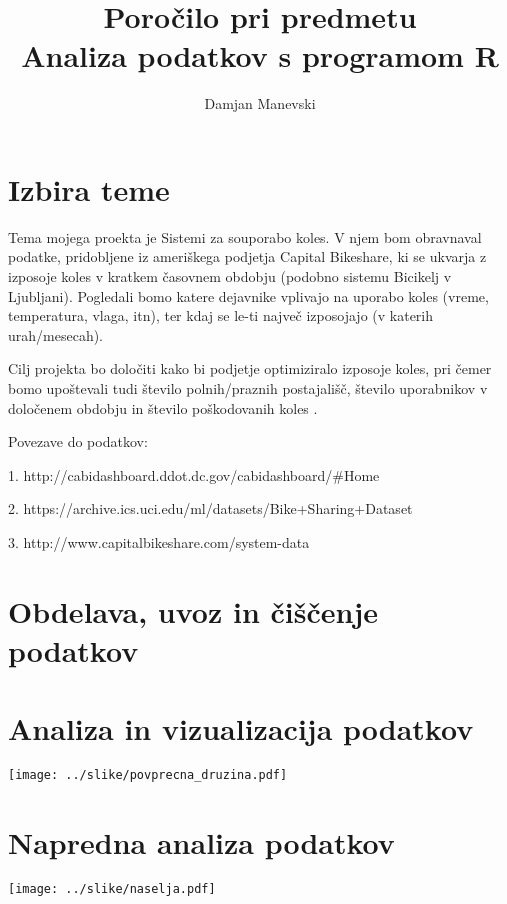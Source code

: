 \documentclass[11pt,a4paper]{article}
\begin{document}
\title{Poročilo pri predmetu \\
Analiza podatkov s programom R}
\author{Damjan Manevski}
\maketitle

\section{Izbira teme}

  Tema mojega proekta je  Sistemi za souporabo koles. V njem bom obravnaval podatke, pridobljene iz ameriškega podjetja Capital Bikeshare, ki se ukvarja z izposoje koles v kratkem časovnem obdobju (podobno sistemu Bicikelj v Ljubljani). Pogledali bomo katere dejavnike vplivajo na uporabo koles (vreme, temperatura, vlaga, itn), ter kdaj se le-ti največ izposojajo (v katerih urah/mesecah).
  
  Cilj projekta bo določiti kako bi podjetje optimiziralo izposoje koles, pri čemer bomo upoštevali tudi število polnih/praznih postajališč, število uporabnikov v določenem obdobju in število poškodovanih koles .
  
  Povezave do podatkov:
  
1.  http://cabidashboard.ddot.dc.gov/cabidashboard/#Home

2.	https://archive.ics.uci.edu/ml/datasets/Bike+Sharing+Dataset

3.	http://www.capitalbikeshare.com/system-data


\section{Obdelava, uvoz in čiščenje podatkov}

\section{Analiza in vizualizacija podatkov}

\texttt{[image: ../slike/povprecna\_druzina.pdf]}

\section{Napredna analiza podatkov}

\texttt{[image: ../slike/naselja.pdf]}
\end{document}
